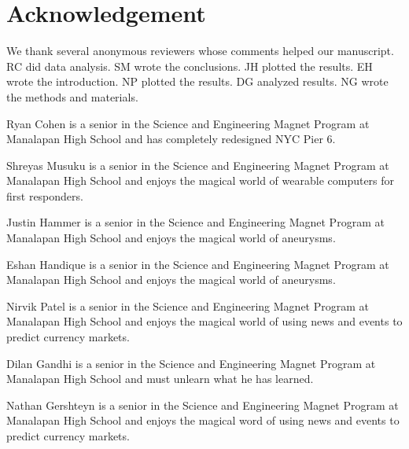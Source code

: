 \documentclass[10pt,journal,twoside]{IEEEtran}
\begin{document}
\section{Acknowledgement}
We thank several anonymous reviewers whose comments helped our manuscript.  RC did data analysis. SM wrote the conclusions. JH plotted the results. EH wrote the introduction. NP plotted the results. DG analyzed results. NG wrote the methods and materials.  

\nocite{tipler}



\begin{IEEEbiography}{Ryan Cohen} is a senior in the Science and Engineering Magnet Program at Manalapan High School and has completely redesigned NYC Pier 6. 
\end{IEEEbiography}
\begin{IEEEbiography}{Shreyas Musuku} is a senior in the Science and Engineering Magnet Program at Manalapan High School and enjoys the magical world of wearable computers for first responders. 
\end{IEEEbiography}
\begin{IEEEbiography}{Justin Hammer} is a senior in the Science and Engineering Magnet Program at Manalapan High School and enjoys the magical world of aneurysms. 
\end{IEEEbiography}
\begin{IEEEbiography}{Eshan Handique} is a senior in the Science and Engineering Magnet Program at Manalapan High School and enjoys the magical world of aneurysms. 
\end{IEEEbiography}
\begin{IEEEbiography}{Nirvik Patel} is a senior in the Science and Engineering Magnet Program at Manalapan High School and enjoys the magical world of using news and events to predict currency markets. 
\end{IEEEbiography}
\vfill\newpage
\begin{IEEEbiography}{Dilan Gandhi} is a senior in the Science and Engineering Magnet Program at Manalapan High School and must unlearn what he has learned. 
\end{IEEEbiography}
\begin{IEEEbiography}{Nathan Gershteyn} is a senior in the Science and Engineering Magnet Program at Manalapan High School and enjoys the magical word of using news and events to predict currency markets. 
\end{IEEEbiography}
\vfill
\end{document}
